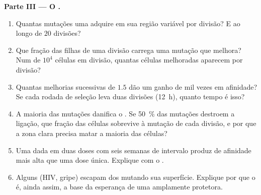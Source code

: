 \begin{problem}
\medskip
\noindent\textbf{Parte III --- O .}
\begin{enumerate}[resume]
  \item Quantas mutações uma  adquire em sua região variável por
        divisão? E ao longo de $20$ divisões?
  \item Que fração das filhas de uma divisão carrega uma mutação que
        melhora? Num  de $10^{4}$ células em divisão,
        quantas células melhoradas aparecem por divisão?
  \item Quantas melhorias sucessivas de $1.5$ dão um ganho de mil vezes
        em afinidade? Se cada rodada de seleção leva duas divisões
        (\qty{12}{h}), quanto tempo é isso?
  \item A maioria das mutações danifica o . Se \qty{50}{\%} das
        mutações destroem a ligação, que fração das células sobrevive à
        mutação de cada divisão, e por que a zona clara precisa matar a
        maioria das células?
  \item Uma  dada em duas doses com seis semanas de intervalo
        produz  de afinidade mais alta que uma dose única.
        Explique com o .
  \item Alguns  (HIV, gripe) escapam dos  mutando sua
        superfície. Explique por que o  é, ainda
        assim, a base da esperança de uma  amplamente protetora.
\end{enumerate}


\end{problem}
